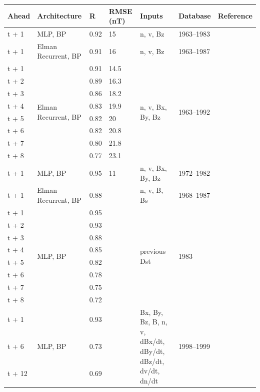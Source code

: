 \documentclass{agujournal2018}
\begin{document}
\begin{table}[htpb]
\centering
\scriptsize
\begin{tabular}{l p{2.5cm} l l p{2.5cm} p{0.8cm} l}
Ahead & Architecture & R & RMSE (nT) & Inputs &  Database & Reference \\ \hline \hline
t + 1 & MLP, BP & 0.92 & 15 & n, v, Bz & 1963--1983 & \cite{Gleisner1996} \\ \hline
t + 1 & Elman Recurrent, BP  & 0.91 & 16 & n, v, Bz & 1963--1987 & \cite{Wu1996} \\ \hline
t + 1 & \multirow{8}{2.5cm}{Elman Recurrent, BP} & 0.91 & 14.5 & \multirow{8}{2.5cm}{n, v, Bx, By, Bz} & \multirow{8}{0.8cm}{1963--1992} & \multirow{8}{*}{\cite{Wu1997a}}  \\ 
t + 2 &   & 0.89 & 16.3 &&  &  \\
t + 3 &   & 0.86 & 18.2 &&  & \\
t + 4 &   & 0.83 & 19.9 &&  &\\
t + 5 &   & 0.82 & 20 &&  &\\
t + 6 &   & 0.82 & 20.8 &&  &\\
t + 7 &   & 0.80 & 21.8 &&  &\\
t + 8 &   & 0.77 & 23.1 && &\\ \hline
t + 1 & MLP, BP & 0.95 & 11 & n, v, Bx, By, Bz & 1972--1982 & \cite{Kugblenu1999} \\ \hline
t + 1 & Elman Recurrent, BP  & 0.88 &  & n, v, B, Bs & 1968--1987 & \cite{Munsami2000} \\ \hline
t + 1 & \multirow{8}{2.5cm}{MLP, BP}  & 0.95 &  & \multirow{8}{*}{previous Dst} & \multirow{8}{0.8cm}{1983} & \multirow{8}{*}{\cite{Stepanova2000}}  \\
t + 2 &  & 0.93 &  &&  & \\
t + 3 &  & 0.88 &  &&  & \\
t + 4 &  & 0.85 &  &&  & \\
t + 5 &  & 0.82 &  &&  & \\
t + 6 &  & 0.78 &  &&  & \\
t + 7 &  & 0.75 &  &&  & \\
t + 8 &  & 0.72 &  &&  & \\ \hline
t + 1 & \multirow{4}{2.5cm}{MLP, BP} & 0.93 &  & \multirow{4}{2.5cm}{Bx, By, Bz, B, n, v, dBx/dt, dBy/dt,
dBz/dt, dv/dt, dn/dt}& \multirow{4}{0.8cm}{1998--1999} &  \multirow{4}{*}{\cite{Jankovivcova2002}} \\
t + 6 &  & 0.73 &  &&  &  \\
t + 12 &  & 0.69 &  &&  &  \\

\end{tabular}
\end{table}
\end{document}
